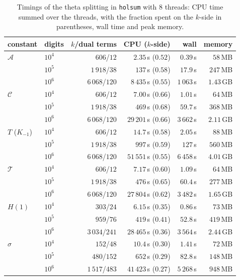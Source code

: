 \documentclass[11pt,reqno]{amsart}
\theoremstyle{definition}
\theoremstyle{remark}
\begin{document}
\begin{table}[tp]
\centering\small
\caption{Timings of the theta splitting in \texttt{holsum} with $8$ threads: CPU time summed over the threads, with
the fraction spent on the $k$-side in parentheses, wall time and peak memory.}
\label{tab:apps}
\begin{tabular}{llrrrr}
\toprule
constant & digits & $k$/dual terms & CPU ($k$-side) & wall & memory \\
\midrule
$\mathcal A$ & $10^4$ & $606$/$12$ & $2.35$\,s ($0.52$) & $0.39$\,s & $58$\,MB \\
 & $10^5$ & $1\,918$/$38$ & $137$\,s ($0.58$) & $17.9$\,s & $247$\,MB \\
 & $10^6$ & $6\,068$/$120$ & $8\,435$\,s ($0.55$) & $1\,063$\,s & $1.43$\,GB \\
\midrule
$\mathcal C$ & $10^4$ & $606$/$12$ & $7.00$\,s ($0.66$) & $1.01$\,s & $64$\,MB \\
 & $10^5$ & $1\,918$/$38$ & $469$\,s ($0.68$) & $59.7$\,s & $368$\,MB \\
 & $10^6$ & $6\,068$/$120$ & $29\,201$\,s ($0.66$) & $3\,662$\,s & $2.11$\,GB \\
\midrule
$T$ ($K_{-1}$) & $10^4$ & $606$/$12$ & $14.7$\,s ($0.58$) & $2.05$\,s & $88$\,MB \\
 & $10^5$ & $1\,918$/$38$ & $997$\,s ($0.59$) & $127$\,s & $560$\,MB \\
 & $10^6$ & $6\,068$/$120$ & $51\,551$\,s ($0.55$) & $6\,458$\,s & $4.01$\,GB \\
\midrule
$\mathcal T$ & $10^4$ & $606$/$12$ & $7.17$\,s ($0.60$) & $1.09$\,s & $64$\,MB \\
 & $10^5$ & $1\,918$/$38$ & $476$\,s ($0.65$) & $60.4$\,s & $277$\,MB \\
 & $10^6$ & $6\,068$/$120$ & $27\,804$\,s ($0.62$) & $3\,482$\,s & $1.65$\,GB \\
\midrule
$H(1)$ & $10^4$ & $303$/$24$ & $6.15$\,s ($0.35$) & $0.86$\,s & $73$\,MB \\
 & $10^5$ & $959$/$76$ & $419$\,s ($0.41$) & $52.8$\,s & $419$\,MB \\
 & $10^6$ & $3\,034$/$241$ & $28\,465$\,s ($0.36$) & $3\,564$\,s & $2.44$\,GB \\
\midrule
$\sigma$ & $10^4$ & $152$/$48$ & $10.4$\,s ($0.30$) & $1.41$\,s & $72$\,MB \\
 & $10^5$ & $480$/$152$ & $652$\,s ($0.29$) & $82.8$\,s & $148$\,MB \\
 & $10^6$ & $1\,517$/$483$ & $41\,423$\,s ($0.27$) & $5\,268$\,s & $948$\,MB \\

\end{tabular}
\end{table}
\end{document}
